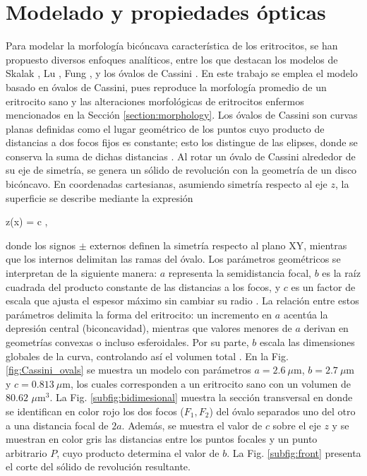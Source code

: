 \section{Modelado y propiedades ópticas}
\label{section:optical_properties}


Para modelar la morfología bicóncava característica de los eritrocitos, se han propuesto diversos enfoques analíticos, entre los que destacan los modelos de Skalak \cite{skalakStrainEnergyFunction1973}, Lu \cite{luSimulationsLightScattering2005}, Fung \cite{fungHighresolutionDataGeometry1981},
 y los óvalos de Cassini \cite{ereminaDifferentShapeModels2006}. En este trabajo se emplea el modelo basado en óvalos de Cassini, pues reproduce la morfología promedio de un eritrocito sano y las alteraciones morfológicas de eritrocitos enfermos mencionados en la Sección \ref{section:morphology}. Los óvalos de Cassini son curvas planas definidas como el lugar geométrico de los puntos cuyo producto de distancias a dos focos fijos es constante; esto los distingue de las elipses, donde se conserva la suma de dichas distancias \cite{wriedtLightScatteringSingle2006}. Al rotar un óvalo de Cassini alrededor de su eje de simetría, se genera un sólido de revolución con la geometría de un disco bicóncavo. En coordenadas cartesianas, asumiendo simetría respecto al eje $z$, la superficie se describe mediante la expresión \cite{ereminaDifferentShapeModels2006}
 \begin{tcolorbox}
 	z(x) = \pm c ,
 	\label{eq:cassini}
 \end{tcolorbox}
\noindent donde los signos $\pm$ externos definen la simetría respecto al plano XY, mientras que los internos delimitan las ramas del óvalo. Los parámetros geométricos se interpretan de la siguiente manera: $a$ representa la semidistancia focal, $b$ es la raíz cuadrada del producto constante de las distancias a los focos, y $c$ es un factor de escala que ajusta el espesor máximo sin cambiar su radio \cite{wriedtLightScatteringSingle2006}. La relación entre estos parámetros delimita la forma del eritrocito: un incremento en $a$ acentúa la depresión central (biconcavidad), mientras que valores menores de $a$ derivan en geometrías convexas o incluso esferoidales. Por su parte, $b$ escala las dimensiones globales de la curva, controlando así el volumen total \cite{ereminaDifferentShapeModels2006}. En la Fig. \ref{fig:Cassini_ovals} se muestra un modelo con parámetros $a=2.6~\mu$m, $b=2.7~\mu$m y $c=0.813~\mu$m, los cuales corresponden a un eritrocito sano con un volumen de $80.62$ $\mu$m$^3$. La Fig. \ref{subfig:bidimesional} muestra la sección transversal en donde se identifican en color rojo los dos focos ($F_1,F_2$) del óvalo separados uno del otro a una distancia focal de $2a$. Además, se muestra el valor de $c$ sobre el eje $z$ y se muestran en color gris las distancias entre los puntos focales y un punto arbitrario $P$, cuyo producto determina el valor de $b$. La Fig. \ref{subfig:front} presenta el corte del sólido de revolución resultante.
